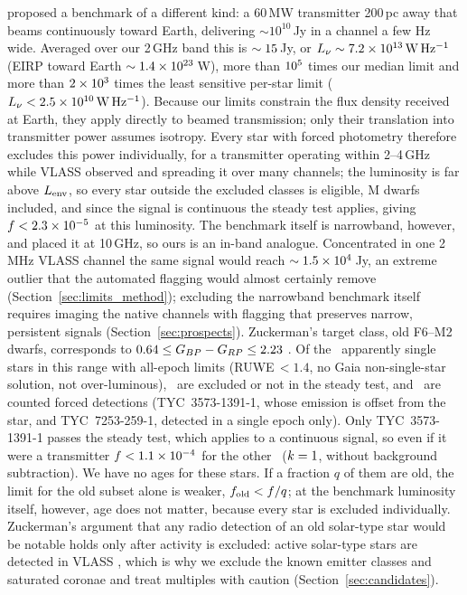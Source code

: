 \documentclass[linenumbers]{aastex702}
\newcommand{\Lnu}{L_\nu}
\newcommand{\WHz}{\mathrm{W\,Hz^{-1}}}
\begin{document}
\citet{Zuckerman2026} proposed a benchmark of a different kind: a 60\,MW transmitter 200\,pc away that beams continuously toward Earth, delivering $\sim10^{10}$\,Jy in a channel a few Hz wide. Averaged over our 2\,GHz band this is $\sim15$\,Jy, or $\Lnu\sim\ZuckL\,\WHz$ (EIRP toward Earth $\sim1.4\times10^{23}$\,W), more than $10^{5}$ times our median limit and more than $2\times10^{3}$ times the least sensitive per-star limit ($\Lnu<\LlimAllMax\,\WHz$). Because our limits constrain the flux density received at Earth, they apply directly to beamed transmission; only their translation into transmitter power assumes isotropy. Every star with forced photometry therefore excludes this power individually, for a transmitter operating within 2--4\,GHz while VLASS observed and spreading it over many channels; the luminosity is far above $L_{\rm env}$, so every star outside the excluded classes is eligible, M dwarfs included, and since the signal is continuous the steady test applies, giving $f<2.3\times10^{-5}$ at this luminosity. The benchmark itself is narrowband, however, and \citet{Zuckerman2026} placed it at 10\,GHz, so ours is an in-band analogue. Concentrated in one 2\,MHz VLASS channel the same signal would reach $\sim1.5\times10^{4}$\,Jy, an extreme outlier that the automated flagging would almost certainly remove (Section~\ref{sec:limits_method}); excluding the narrowband benchmark itself requires imaging the native channels with flagging that preserves narrow, persistent signals (Section~\ref{sec:prospects}). Zuckerman's target class, old F6--M2 dwarfs, corresponds to $0.64\le G_{BP}-G_{RP}\le2.23$ \citep{Pecaut2013}. Of the \NSolarSingle\ apparently single stars in this range with all-epoch limits (RUWE$\,<1.4$, no Gaia non-single-star solution, not over-luminous), \NSolarActive\ are excluded or not in the steady test, and \NSolarUnexpl\ are counted forced detections (TYC~3573-1391-1, whose emission is offset from the star, and TYC~7253-259-1, detected in a single epoch only). Only TYC~3573-1391-1 passes the steady test, which applies to a continuous signal, so even if it were a transmitter $f<1.1\times10^{-4}$ for the other \NSolarInactive\ ($k=1$, without background subtraction). We have no ages for these stars. If a fraction $q$ of them are old, the limit for the old subset alone is weaker, $f_{\rm old}<f/q$; at the benchmark luminosity itself, however, age does not matter, because every star is excluded individually. Zuckerman's argument that any radio detection of an old solar-type star would be notable \citep[citing][]{Matthews2025} holds only after activity is excluded: active solar-type stars are detected in VLASS \citep[][and this work]{Davis2026}, which is why we exclude the known emitter classes and saturated coronae and treat multiples with caution (Section~\ref{sec:candidates}).
\end{document}
